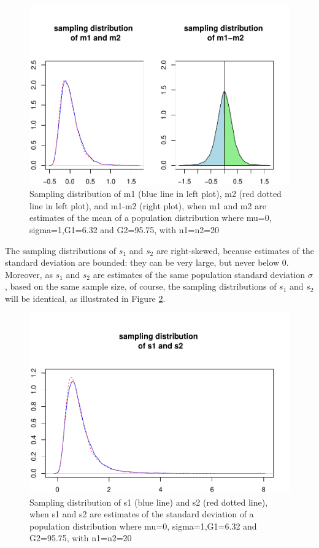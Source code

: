 \documentclass[
  man,floatsintext]{apa6}
\begin{document}
\begin{figure}
\centering
\includegraphics{Mathematical-study-of-Glass-s-d_files/figure-latex/sampldist1-1.pdf}
\caption{\label{fig:sampldist1}Sampling distribution of m1 (blue line in left plot), m2 (red dotted line in left plot), and m1-m2 (right plot), when m1 and m2 are estimates of the mean of a population distribution where mu=0, sigma=1,G1=6.32 and G2=95.75, with n1=n2=20}
\end{figure}

The sampling distributions of \(s_1\) and \(s_2\) are right-skewed, because estimates of the standard deviation are bounded: they can be very large, but never below 0. Moreover, as \(s_1\) and \(s_2\) are estimates of the same population standard deviation \(\sigma\), based on the same sample size, of course, the sampling distributions of \(s_1\) and \(s_2\) will be identical, as illustrated in Figure \ref{fig:sampldist2}.

\begin{figure}
\centering
\includegraphics{Mathematical-study-of-Glass-s-d_files/figure-latex/sampldist2-1.pdf}
\caption{\label{fig:sampldist2}Sampling distribution of s1 (blue line) and s2 (red dotted line), when s1 and s2 are estimates of the standard deviation of a population distribution where mu=0, sigma=1,G1=6.32 and G2=95.75, with n1=n2=20}
\end{figure}
\end{document}
